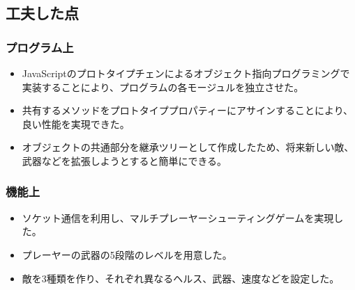 \subsection{工夫した点}
	\subsubsection{プログラム上}
		\begin{itemize}
			\item JavaScriptのプロトタイプチェンによるオブジェクト指向プログラミングで実装することにより、プログラムの各モージュルを独立させた。
			\item 共有するメソッドをプロトタイププロパティーにアサインすることにより、良い性能を実現できた。
			\item オブジェクトの共通部分を継承ツリーとして作成したため、将来新しい敵、武器などを拡張しようとすると簡単にできる。
		\end{itemize}
	\subsubsection{機能上}
		\begin{itemize}
			\item ソケット通信を利用し、マルチプレーヤーシューティングゲームを実現した。
			\item プレーヤーの武器の5段階のレベルを用意した。
			\item 敵を3種類を作り、それぞれ異なるヘルス、武器、速度などを設定した。
		\end{itemize}